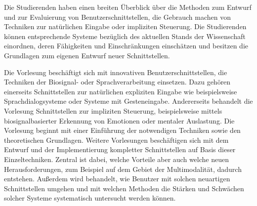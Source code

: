 \begin{module}
\begin{learningoutcomes}
Die Studierenden haben einen breiten Überblick über die Methoden zum Entwurf und zur Evaluierung von Benutzerschnittstellen, die Gebrauch machen von Techniken zur natürlichen Eingabe oder impliziten Steuerung. Die Studierenden können entsprechende Systeme bezüglich des aktuellen Stands der Wissenschaft einordnen, deren Fähigkeiten und Einschränkungen einschätzen und besitzen die Grundlagen zum eigenen Entwurf neuer Schnittstellen.


\end{learningoutcomes}

\begin{content}
Die Vorlesung beschäftigt sich mit innovativen Benutzerschnittstellen, die Techniken der Biosignal- oder Sprachverarbeitung einsetzen. Dazu gehören einerseits Schnittstellen zur natürlichen expliziten Eingabe wie beispielsweise Sprachdialogsysteme oder Systeme mit Gesteneingabe. Andererseits behandelt die Vorlesung Schnittstellen zur impliziten Steuerung, beispielsweise mittels biosignalbasierter Erkennung von Emotionen oder mentaler Auslastung. Die Vorlesung beginnt mit einer Einführung der notwendigen Techniken sowie den theoretischen Grundlagen. Weitere Vorlesungen beschäftigen sich mit dem Entwurf und der Implementierung kompletter Schnittstellen auf Basis dieser Einzeltechniken. Zentral ist dabei, welche Vorteile aber auch welche neuen Herausforderungen, zum Beispiel auf dem Gebiet der Multimodalität, dadurch entstehen. Außerdem wird behandelt, wie Benutzer mit solchen neuartigen Schnittstellen umgehen und mit welchen Methoden die Stärken und Schwächen solcher Systeme systematisch untersucht werden können.


\end{content}



\end{module}

